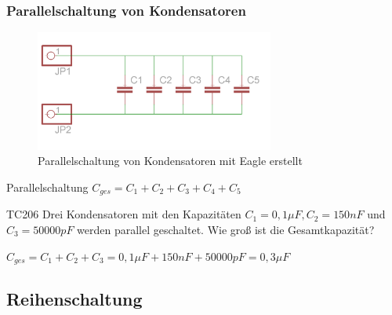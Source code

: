 \begin{frame}
  \frametitle{Parallelschaltung von Kondensatoren}
  \begin{center}
    \begin{figure}
      \includegraphics[width=0.7\textwidth,height=.5\textheight,keepaspectratio]{e05/c-parallel.png}
      \caption{Parallelschaltung von Kondensatoren {\tiny mit Eagle erstellt}}
    \end{figure}
  \end{center}
  \begin{block}{Parallelschaltung}
    $C_{ges} = C_1 + C_2 + C_3 + C_4 + C_5$
  \end{block}
\end{frame}

\begin{frame}
  \begin{exampleblock}{TC206}
    Drei Kondensatoren mit den Kapazitäten $C_{1} = 0,1 \mu F, C_{2} = 150 nF$ und $C_{3} = 50000 pF$ werden parallel geschaltet. Wie groß ist die Gesamtkapazität?
  \end{exampleblock}
  \pause
  \begin{center}
    $C_{ges} = C_1 + C_2 + C_3 = 0,1 \mu F + 150 nF + 50000 pF = 0,3 \mu F$
  \end{center}
\end{frame}

\subsection*{Reihen\-schaltung}

